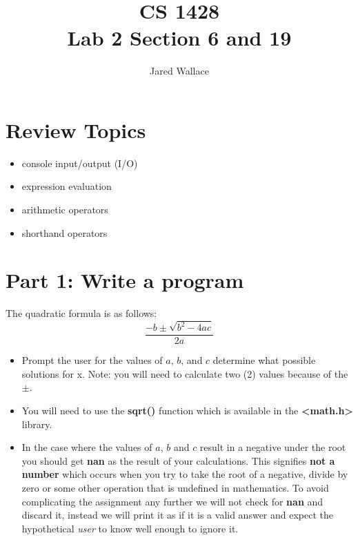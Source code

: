 \documentclass[letterpaper,12pt]{article}
\title{\Large CS 1428\\Lab 2 Section 6 and 19}
\author{Jared Wallace}
\date{}
\begin{document}
\maketitle

\section*{Review Topics}
\begin{itemize}
\item console input/output (I/O)
	\item expression evaluation
	\item arithmetic operators
	\item shorthand operators
	\end{itemize}

	\section*{Part 1: Write a program}
	The quadratic formula is as follows:
	\begin{equation}
	\frac{-b\pm \sqrt{b^2 - 4ac} }{2a}
	\end{equation}

	\begin{itemize}
			\item Prompt the user for the values of $a$, $b$, and $c$ determine what possible solutions for x.  
				Note: you will need to calculate two (2) values because of the $\pm$.  
			\item You will need to use the \textbf{sqrt()} function which is available in the \textbf{\textless math.h\textgreater} library.  
			\item In the case where the values of $a$, $b$ and $c$ result in a negative under the root you should get \textbf{nan} as the result of your calculations.  This signifies \textbf{not a number} which occurs when you try to take the root of a negative, divide by zero or some other operation that is undefined in mathematics. To avoid complicating the assignment any further we will not check for \textbf{nan} and discard it, instead we will print it as if it is a valid answer and expect the hypothetical \emph{user} to know well enough to ignore it.
	\end{itemize}

	
\end{document}
